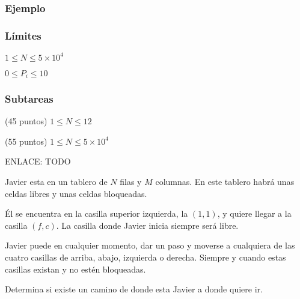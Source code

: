 \subsubsection*{Ejemplo}
\begin{casebox3}
\end{casebox3}

\subsubsection*{Límites}
\begin{plimits}
	\item \(1\leq N\leq 5\times10^4\)
	\item \(0\leq P_i\leq 10\)
\end{plimits}
\subsubsection*{Subtareas}
\begin{plimits}
	\item (45 puntos) \(1\leq N\leq 12\)
	\item (55 puntos) \(1\leq N\leq 5\times10^4\)
\end{plimits}

ENLACE: TODO

\problemtitle Javier esta en un tablero de \(N\) filas y \(M\) columnas. En este tablero habrá unas celdas libres y unas celdas bloqueadas.

Él se encuentra en la casilla superior izquierda, la \((1, 1)\), y quiere llegar a la casilla \((f,c)\). La casilla donde Javier inicia siempre será libre.

Javier puede en cualquier momento, dar un paso y moverse a cualquiera de las cuatro casillas de arriba, abajo, izquierda o derecha. Siempre y cuando estas casillas existan y no estén bloqueadas. 

Determina si existe un camino de donde esta Javier a donde quiere ir.

